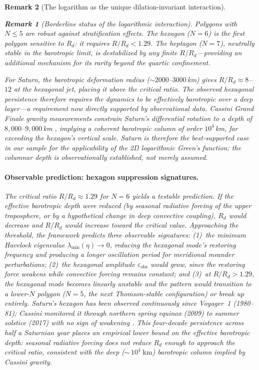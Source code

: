 \documentclass[12pt, a4paper]{article}
\newtheorem{remark}{Remark}[section]
\numberwithin{equation}{section}
\begin{document}
\begin{remark}[The logarithm as the unique dilation-invariant interaction]
\begin{remark}[Borderline status of the logarithmic interaction]
\noindent
Polygons with $N \le 5$ are robust against stratification effects.
The hexagon ($N = 6$) is the first polygon sensitive to $R_d$: it
requires $R/R_d < 1.29$.  The heptagon ($N = 7$), neutrally stable
in the barotropic limit, is destabilized by any finite
$R/R_d$---providing an additional mechanism for its rarity beyond the
quartic confinement.

For Saturn, the barotropic deformation radius
($\sim\!2000$--$3000\,$km) gives $R/R_d \approx 8$--$12$ at the
hexagonal jet, placing it above the critical ratio.  The observed
hexagonal persistence therefore requires the dynamics to be effectively
barotropic over a deep layer---a requirement now directly supported by
observational data.  Cassini Grand Finale gravity measurements constrain
Saturn's differential rotation to a depth of $8{,}000$--$9{,}000$\,km
\citep{Iess2019}, implying a coherent barotropic column of order
$10^4$\,km, far exceeding the hexagon's vertical scale.  Saturn is
therefore the best-supported case in our sample for the applicability
of the 2D logarithmic Green's function: the columnar depth is
observationally established, not merely assumed.

\paragraph{Observable prediction: hexagon suppression signatures.}
The critical ratio $R/R_d \approx 1.29$ for $N = 6$ yields a
testable prediction.  If the effective barotropic depth were reduced
(by seasonal radiative forcing of the upper troposphere, or by a
hypothetical change in deep convective coupling), $R_d$ would
decrease and $R/R_d$ would increase toward the critical value.
Approaching the threshold, the framework predicts three observable
signatures: (1)~the minimum Havelock eigenvalue
$\lambda_{\min}(\eta) \to 0$, reducing the hexagonal mode's
restoring frequency and producing a \emph{longer oscillation period}
for meridional meander perturbations;
(2)~the hexagonal amplitude $\varepsilon_{\mathrm{obs}}$ would
\emph{grow}, since the restoring force weakens while convective
forcing remains constant; and
(3)~at $R/R_d > 1.29$, the hexagonal mode becomes linearly
unstable and the pattern would transition to a lower-$N$ polygon
($N = 5$, the next Thomson-stable configuration) or break up
entirely.
Saturn's hexagon has been observed continuously since Voyager~1
(1980--81); Cassini monitored it through northern spring equinox
(2009) to summer solstice (2017) with no sign of weakening
\citep{Antunano2015, SanchezLavega2014}.  This four-decade
persistence across half a Saturnian year places an empirical lower
bound on the effective barotropic depth: seasonal radiative forcing
does not reduce $R_d$ enough to approach the critical ratio, consistent
with the deep (${\sim}\,10^4\;\mathrm{km}$) barotropic column
implied by Cassini gravity.


\end{remark}
\end{remark}
\end{document}
